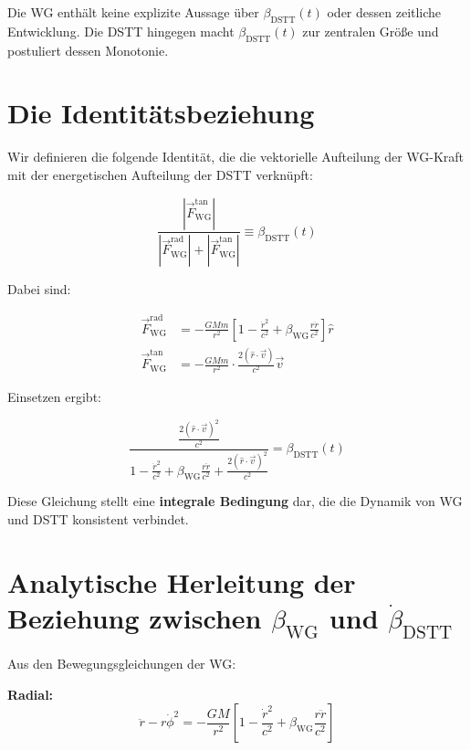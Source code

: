 \documentclass[12pt,a4paper]{article}
\begin{document}
Die WG enthält keine explizite Aussage über \(\beta_{\text{DSTT}}(t)\) oder dessen zeitliche Entwicklung. Die DSTT hingegen macht \(\beta_{\text{DSTT}}(t)\) zur zentralen Größe und postuliert dessen Monotonie.

\section{Die Identitätsbeziehung}

Wir definieren die folgende Identität, die die vektorielle Aufteilung der WG-Kraft mit der energetischen Aufteilung der DSTT verknüpft:

\begin{equation}
\boxed{\frac{|\vec{F}_{\text{WG}}^{\text{tan}}|}{|\vec{F}_{\text{WG}}^{\text{rad}}| + |\vec{F}_{\text{WG}}^{\text{tan}}|} \equiv \beta_{\text{DSTT}}(t)}
\end{equation}

Dabei sind:

\begin{align}
\vec{F}_{\text{WG}}^{\text{rad}} &= -\frac{GMm}{r^2} \left[1 - \frac{\dot{r}^2}{c^2} + \beta_{\text{WG}}\frac{r\ddot{r}}{c^2}\right] \hat{r} \\
\vec{F}_{\text{WG}}^{\text{tan}} &= -\frac{GMm}{r^2} \cdot \frac{2(\hat{r}\cdot\vec{v})}{c^2}\vec{v}
\end{align}

Einsetzen ergibt:

\begin{equation}
\frac{\frac{2(\hat{r}\cdot\vec{v})^2}{c^2}}{1 - \frac{\dot{r}^2}{c^2} + \beta_{\text{WG}}\frac{r\ddot{r}}{c^2} + \frac{2(\hat{r}\cdot\vec{v})^2}{c^2}} = \beta_{\text{DSTT}}(t)
\end{equation}

Diese Gleichung stellt eine \textbf{integrale Bedingung} dar, die die Dynamik von WG und DSTT konsistent verbindet.

\section{Analytische Herleitung der Beziehung zwischen \(\beta_{\text{WG}}\) und \(\dot{\beta}_{\text{DSTT}}\)}

Aus den Bewegungsgleichungen der WG:

\textbf{Radial:}
\begin{equation}
\ddot{r} - r\dot{\phi}^2 = -\frac{GM}{r^2} \left[1 - \frac{\dot{r}^2}{c^2} + \beta_{\text{WG}}\frac{r\ddot{r}}{c^2}\right]
\end{equation}
\end{document}
